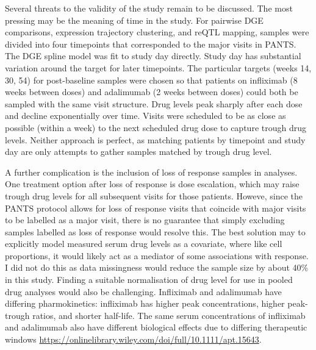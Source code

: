 \begin{outline}
Several threats to the validity of the study remain to be discussed.
The most pressing may be the meaning of time in the study.
For pairwise \gls{DGE} comparisons, expression trajectory clustering, and \gls{reQTL} mapping, 
samples were divided into four timepoints that corresponded to the major visits in \gls{PANTS}.
The \gls{DGE} spline model was fit to study day directly.
Study day has substantial variation around the target for later timepoints.
The particular targets (weeks 14, 30, 54) for post-baseline samples were chosen so that patients on infliximab (8 weeks between doses) and adalimumab (2 weeks between doses) could both be sampled with the same visit structure.
Drug levels peak sharply after each dose and decline exponentially over time.
Visits were scheduled to be as close as possible (within a week) to the next scheduled drug dose to capture trough drug levels.
Neither approach is perfect, as matching patients by timepoint and study day are only attempts to gather samples matched by trough drug level.

A further complication is the inclusion of loss of response samples in analyses.
One treatment option after loss of response is dose escalation, which may raise trough drug levels for all subsequent visits for those patients.
Howeve, since the \gls{PANTS} protocol allows for loss of response visits that coincide with major visits to be labelled as a major visit,
there is no guarantee that simply excluding samples labelled as loss of response would resolve this.
The best solution may to explicitly model measured serum drug levels as a covariate, where like cell proportions, it would likely act as a mediator of some associations with response.
I did not do this as data missingness would reduce the sample size by about 40\% in this study.
Finding a suitable normalisation of drug level for use in pooled drug analyses would also be challenging.
Infliximab and adalimumab have differing pharmokinetics: infliximab has higher peak concentrations, higher peak-trough ratios, and shorter half-life.
The same serum concentrations of infliximab and adalimumab also have different biological effects due to differing therapeutic windows
\autocite{tracey2008TumorNecrosisFactor,lichtenstein2013ComprehensiveReviewAntitumor} \url{https://onlinelibrary.wiley.com/doi/full/10.1111/apt.15643}.


\end{outline}
